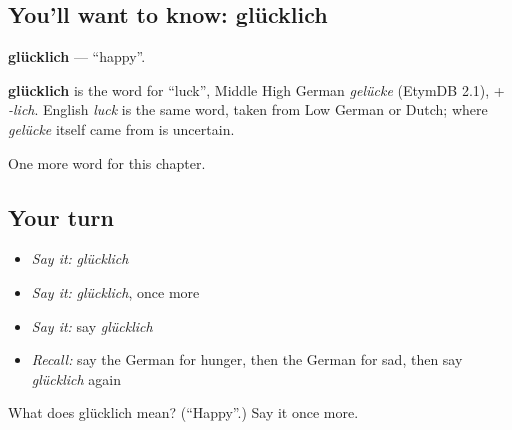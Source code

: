 \subsection*{You'll want to know: glücklich}
\textbf{glücklich} — \textquotedblleft{}happy\textquotedblright{}.

\begin{cousinweb}
\textbf{glücklich} is the word for \textquotedblleft{}luck\textquotedblright{}, Middle High German \emph{gelücke} (EtymDB 2.1), + \emph{-lich}. English \emph{luck} is the same word, taken from Low German or Dutch; where \emph{gelücke} itself came from is uncertain.
\end{cousinweb}

\begin{grammarlens}[title={What you've built}]
One more word for this chapter.
\end{grammarlens}

\subsection*{Your turn}
\begin{itemize}
\raggedright
  \item \emph{Say it:} \emph{glücklich}
  \item \emph{Say it:} \emph{glücklich}, once more
  \item \emph{Say it:} say \emph{glücklich}
  \item \emph{Recall:} say the German for hunger, then the German for sad, then say \emph{glücklich} again
\end{itemize}

\begin{tcolorbox}[breakable,colback=teal!4,colframe=teal!35!black,title={Before you move on}]
What does glücklich mean? (\textquotedblleft{}Happy\textquotedblright{}.) Say it once more.
\end{tcolorbox}
